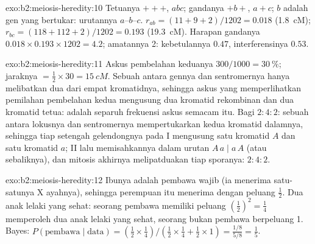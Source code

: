 \begin{solution}{exo:b2:meiosis-heredity:10}
Tetuanya $+++$, $abc$;  gandanya $+b+$, $a+c$; $b$ adalah
gen yang bertukar: urutannya $a$--$b$--$c$. $r_{ab} = (11 + 9 + 2)/1202
= 0.018$ (\qty{1.8}{cM}); $r_{bc} = (118 + 112 + 2)/1202 = 0.193$
(\qty{19.3}{cM}). Harapan gandanya $0.018\times 0.193\times 1202 =
4.2$; amatannya 2: kebetulannya $0.47$, interferensinya $0.53$.
\end{solution}

\begin{solution}{exo:b2:meiosis-heredity:11}
Askus pembelahan keduanya $300/1000 = \qty{30}{\%}$; jaraknya $=
\tfrac12\times 30 = \qty{15}{cM}$. Sebuah  antara gennya
dan sentromernya hanya melibatkan dua dari empat kromatidnya, sehingga
askus yang memperlihatkan pemilahan pembelahan kedua mengusung dua
kromatid rekombinan dan dua kromatid tetua: 
adalah separuh frekuensi askus semacam itu. Bagi $2 : 4 : 2$: sebuah
 antara lokusnya dan sentromernya mempertukarkan kedua
kromatid dalamnya, sehingga tiap setengah gelendongnya pada  I
mengusung satu kromatid $A$ dan satu kromatid $a$;  II lalu
memisahkannya dalam urutan $A\,a \mid
a\,A$ (atau sebaliknya), dan mitosis akhirnya melipatduakan tiap
sporanya: $2 : 4 : 2$.
\end{solution}

\begin{solution}{exo:b2:meiosis-heredity:12}
Ibunya adalah pembawa wajib (ia menerima satu-satunya X ayahnya),
sehingga perempuan itu menerima  dengan peluang $\tfrac12$.
Dua anak lelaki yang sehat: seorang pembawa memiliki peluang
$(\tfrac12)^2 = \tfrac14$ memperoleh dua anak lelaki yang sehat,
seorang bukan pembawa berpeluang 1. Bayes:
$P(\text{pembawa}\mid\text{data}) = (\tfrac12\times\tfrac14)/(\tfrac12
\times\tfrac14 + \tfrac12\times 1) = \tfrac{1/8}{5/8} = \tfrac15$.
\end{solution}

